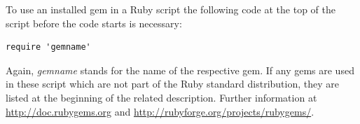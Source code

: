To use an installed gem in a Ruby script the following code at the top of the script before the code starts is necessary:

\begin{lstlisting}[float=htb, caption=Using the gem \emph{gemname}, label=listing001]
require 'gemname'
\end{lstlisting}
Again, \emph{gemname} stands for the name of the respective gem. If any gems are used in these script which are not part of the Ruby standard distribution, they are listed at the beginning of the related description. Further information at \url{http://doc.rubygems.org} and \url{http://rubyforge.org/projects/rubygems/}.

